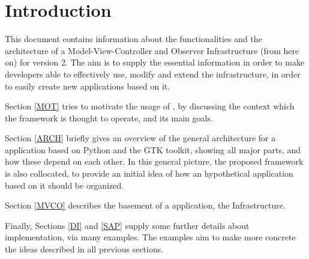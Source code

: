 \section{Introduction}

This document contains information about the functionalities and the
architecture of a Model-View-Controller and Observer Infrastructure
(\mvco from here on) for \pygtk version 2. The aim is to supply the
essential information in order to make developers able to effectively
use, modify and extend the infrastructure, in order to easily create
new applications based on it.

\bigskip

Section \ref{MOT} tries to motivate the usage of \pygtkmvc, by
discussing the context which the framework is thought to operate, and
its main goals.

Section \ref{ARCH} briefly gives an overview of the general
architecture for a \gui application based on Python and the GTK
toolkit, showing all major parts, and how these depend on each other.
In this general picture, the proposed \mvco framework is also
collocated, to provide an initial idea of how an hypothetical
application based on it should be organized.

Section \ref{MVCO} describes the basement of a \gui application, the
\mvco Infrastructure. 

Finally, Sections \ref{DI} and \ref{SAP} supply some further details
about implementation, via many examples. The examples aim to make more
concrete the ideas described in all previous sections.

